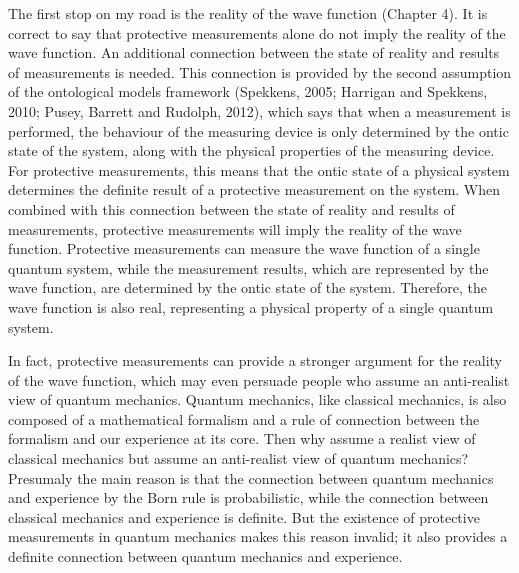 The first stop on my road is the reality of the wave function (Chapter 4).
It is correct to say that protective measurements alone do not imply the reality of the wave function.
An additional connection between the state of reality and results of measurements is needed.
This connection is provided by the second assumption of the ontological models framework (Spekkens, 2005; Harrigan and Spekkens, 2010; Pusey, Barrett and Rudolph, 2012), which says that when a measurement is performed, the behaviour of the measuring device is only determined by the ontic state of the system, along with the physical properties of the measuring device. For protective measurements, this  means that the ontic state  of a physical system determines the definite result of a protective measurement on the system.
When combined with this connection between the state of reality and results of measurements, protective measurements will imply the reality of the wave function.
Protective measurements can measure the wave function of a single quantum system, while the measurement results, which are represented by the wave function, are determined by the ontic state of the system. Therefore, the wave function is also real, representing a physical property of a single quantum system.

In fact, protective measurements can provide a stronger argument for the reality of the wave function, which may even persuade people who assume an anti-realist view of quantum mechanics.
Quantum mechanics, like classical mechanics, is also composed of a mathematical formalism and a rule of connection between the formalism and our experience at its core.
Then why assume a realist view of classical mechanics but assume an anti-realist view of quantum mechanics?
Presumaly the main reason is that the connection between quantum mechanics and experience by the Born rule is probabilistic, while the connection between classical mechanics and experience is definite.
But the existence of protective measurements in quantum mechanics makes this reason invalid; it also provides a definite connection between quantum mechanics and experience.

